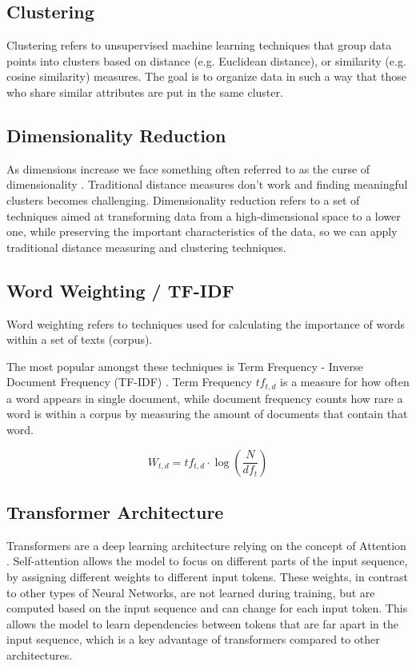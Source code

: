 \subsection{Clustering}
Clustering refers to unsupervised machine learning techniques that group data points into clusters based on distance (e.g. Euclidean distance), or similarity (e.g. cosine similarity) measures. The goal is to organize data in such a way that those who share similar attributes are put in the same cluster.

\subsection{Dimensionality Reduction}
As dimensions increase we face something often referred to as the curse of dimensionality \citep{Bellman:57}. Traditional distance measures don't work and finding meaningful clusters becomes challenging. Dimensionality reduction refers to a set of techniques aimed at transforming data from a high-dimensional space to a lower one, while preserving the important characteristics of the data, so we can apply traditional distance measuring and clustering techniques. 

\subsection{Word Weighting / TF-IDF}
Word weighting refers to techniques used for calculating the importance of words within a set of texts (corpus). 

The most popular amongst these techniques is Term Frequency - Inverse Document Frequency (TF-IDF) \citep{SALTON1988513}. Term Frequency $tf_{t,d}$ is a measure for how often a word appears in single document, while document frequency counts how rare a word is within a corpus by measuring the amount of documents that contain that word.

\begin{equation}\label{tf-idf}
W_{t,d} = tf_{t,d} \cdot \log(\frac{N}{df_t})
\end{equation}

\subsection{Transformer Architecture}
Transformers \citep{vaswani2023attention} are a deep learning architecture relying on the concept of Attention \citep{bahdanau2016neural}. Self-attention allows the model to focus on different parts of the input sequence, by assigning different weights to different input tokens. These weights, in contrast to other types of Neural Networks, are not learned during training, but are computed based on the input sequence and can change for each input token. This allows the model to learn dependencies between tokens that are far apart in the input sequence, which is a key advantage of transformers compared to other architectures. 

